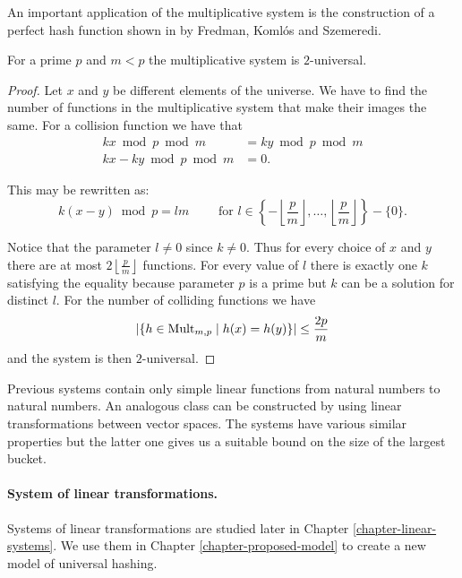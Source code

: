 An important application of the multiplicative system is the construction of a perfect hash function shown in \cite{1884} by Fredman, Koml\'os and Szemeredi.

\begin{theorem}
For a prime $p$ and $m < p$ the multiplicative system is $2$-universal.
\end{theorem}
\begin{proof}
Let $x$ and $y$ be different elements of the universe. We have to find the number of functions in the multiplicative system that make their images the same. For a collision function we have that
\begin{displaymath}
\begin{split}
kx \bmod p \bmod m & = ky \bmod p \bmod m \\
kx - ky \bmod p \bmod m & = 0 \text{.}
\end{split}
\end{displaymath}

This may be rewritten as:
\begin{displaymath}
k(x - y) \bmod p = l m \qquad \text{ for  } l \in \left\lbrace -\left\lfloor\frac{p}{m}\right\rfloor, \dots, \left\lfloor\frac{p}{m}\right\rfloor \right\rbrace - \{0\} \text{.}
\end{displaymath}

Notice that the parameter $l \neq 0$ since $k \neq 0$. Thus for every choice of $x$ and $y$ there are at most $2\left\lfloor\frac{p}{m}\right\rfloor$ functions. For every value of $l$ there is exactly one $k$ satisfying the equality because parameter $p$ is a prime but $k$ can be a solution for distinct $l$. For the number of colliding functions we have \[ | \lbrace h \in \mathrm{Mult}_{m,p} \mid h(x) = h(y) \rbrace | \leq \frac{2p}{m} \] and the system is then $2$-universal.
\end{proof}

Previous systems contain only simple linear functions from natural numbers to natural numbers. An analogous class can be constructed by using linear transformations between vector spaces. The systems have various similar properties but the latter one gives us a suitable bound on the size of the largest bucket.

\paragraph{System of linear transformations.} 
Systems of linear transformations are studied later in Chapter \ref{chapter-linear-systems}. We use them in Chapter \ref{chapter-proposed-model} to create a new model of universal hashing.

